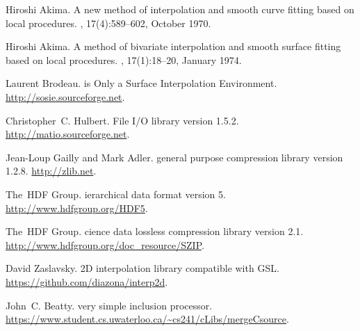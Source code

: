 \documentclass[11pt,a4paper,twocolumn]{article}
\begin{document}
\begin{thebibliography}{00}

Hiroshi Akima.
\newblock A new method of interpolation and smooth curve fitting based on local
  procedures.
, 17(4):589--602, October 1970.

Hiroshi Akima.
\newblock A method of bivariate interpolation and smooth surface fitting based
  on local procedures.
, 17(1):18--20, January 1974.

Laurent Brodeau.
 is {O}nly a {S}urface {I}nterpolation {E}nvironment.
\newblock \url{http://sosie.sourceforge.net}.

Christopher~C. Hulbert.
 {F}ile {I}/{O} library version 1.5.2.
\newblock \url{http://matio.sourceforge.net}.

Jean-Loup Gailly and Mark Adler.
 general purpose compression library version 1.2.8.
\newblock \url{http://zlib.net}.

The~HDF Group.
ierarchical data format version 5.
\newblock \url{http://www.hdfgroup.org/HDF5}.

The~HDF Group.
cience data lossless compression library version 2.1.
\newblock \url{http://www.hdfgroup.org/doc_resource/SZIP}.

David Zaslavsky.
 2{D} interpolation library compatible with {GSL}.
\newblock \url{https://github.com/diazona/interp2d}.

John~C. Beatty.
 very simple inclusion processor.
\newblock \url{https://www.student.cs.uwaterloo.ca/~cs241/cLibs/mergeCsource}. 

\end{thebibliography}
\end{document}
